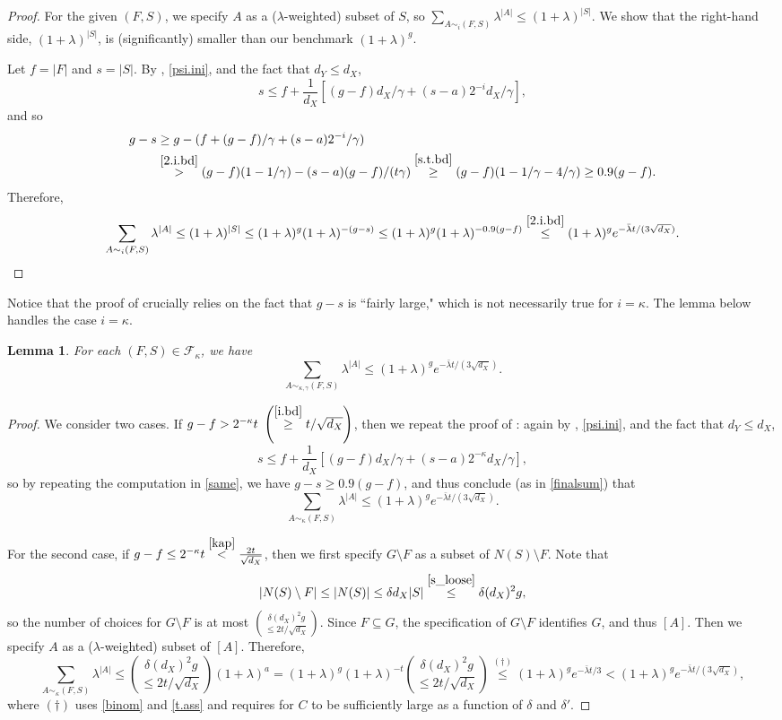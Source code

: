 \documentclass[a4paper]{amsart}
\newtheorem{lem}[thm]{Lemma}
\theoremstyle{definition}
\newcommand{\gl}{\lambda}
\newcommand{\beq}[1]{\begin{equation}\label{#1}}
\newcommand{\enq}[0]{\end{equation}}
\newcommand{\sub}[0]{\subseteq}
\newcommand{\0}[0]{\emptyset}
\newcommand{\qr}{\gamma}
\begin{document}
\begin{proof}
For the given $(F,S)$, we specify $A$ as a ($\gl$-weighted) subset of $S$, so $\sum_{A \sim_i(F,S)} \gl^{|A|} \le (1+\gl)^{|S|}$. We show that the right-hand side, $(1+\gl)^{|S|}$, is (significantly) smaller than our benchmark $(1+\gl)^g$.

Let $f=|F|$ and $s=|S|.$ By , \eqref{psi.ini}, and the fact that $d_Y\leq d_X$,
\[s \le f+\frac{1}{d_X}[(g-f)d_X/\qr+(s-a)2^{-i}d_X/\qr],\]
and so
\beq{same}\begin{split} g-s &\ge g-(f+(g-f)/\qr+(s-a)2^{-i}/\qr)\\
& \stackrel{\eqref{2.i.bd}}{>} (g-f)(1-1/\qr)-(s-a)(g-f)/(t\qr)\stackrel{\eqref{s.t.bd}}{\ge}(g-f)(1-1/\qr-4/\qr)\ge 0.9(g-f).\end{split}\enq
Therefore,
\beq{finalsum}\sum_{A \sim_i (F, S)} \gl^{|A|} \le (1+\gl)^{|S|} \le (1+\gl)^g(1+\gl)^{-(g-s)} \le (1+\gl)^g(1+\gl)^{-0.9(g-f)}\stackrel{\eqref{2.i.bd}}{\le }(1+\gl)^ge^{-\bar\gl t/(3\sqrt {d_X})}.\enq
\end{proof}

Notice that the proof of  crucially relies on the fact that $g-s$ is ``fairly large," which is not necessarily true for $i=\kappa$. The lemma below handles the case $i=\kappa$.

\begin{lem}\label{lem_large F} For each $(F, S) \in \mathcal{F}_\kappa$, we have
\[\sum_{A \sim_{\kappa, \gamma} (F, S)} \gl^{|A|} \le (1+\gl)^ge^{-\bar\gl t/(3\sqrt{d_X})}.\]
\end{lem}

\begin{proof} We consider two cases. If $g-f>2^{-\kappa}t~\left(\stackrel{\eqref{i.bd}}{\ge} t/\sqrt {d_X} \right)$, then we repeat the proof of : again by , \eqref{psi.ini}, and the fact that $d_Y\leq d_X$,
\[s \le f+\frac{1}{d_X}[(g-f)d_X/\qr+(s-a)2^{-\kappa}d_X/\qr],\]
so by repeating the computation in \eqref{same}, we have $g-s \ge 0.9(g-f)$, and thus conclude (as in \eqref{finalsum}) that
\[\sum_{A \sim_\kappa(F,S)} \gl^{|A|} \le (1+\gl)^ge^{-\bar\gl t/(3\sqrt{d_X})}.\]

For the second case, if $g-f \le 2^{-\kappa} t \stackrel{\eqref{kap}}{<}\frac{2t}{\sqrt{d_X}}$, then we first specify $G \setminus F$ as a subset of $N(S) \setminus F$. Note that 
\[|N(S) \setminus F| \le |N(S)| \le \delta d_X|S| \stackrel{\eqref{s_loose}}{\le} \delta(d_X)^2g,\]
so the number of choices for $G \setminus F$ is at most $\displaystyle {\delta (d_X)^2g \choose \le 2t/\sqrt {d_X}}.$  Since $F \sub G$, the specification of $G \setminus F$ identifies $G$, and thus $[A]$. Then we specify $A$ as a ($\lambda$-weighted) subset of $[A]$. Therefore,
\[\sum_{A \sim_\kappa (F, S)} \gl^{|A|} \le {\delta(d_X)^2 g \choose \le 2t/\sqrt {d_X}} (1+\gl)^a =(1+\gl)^g(1+\gl)^{-t}{\delta(d_X)^2 g \choose \le 2t/\sqrt {d_X}}\stackrel{(\dagger)}{\leq}(1+\gl)^ge^{-\bar\gl t/3}<(1+\gl)^g e^{-\bar\gl t/(3\sqrt{d_X})},\]
where $(\dagger)$ uses \eqref{binom} and \eqref{t.ass} and requires for $C$ to be sufficiently large as a function of $\delta$ and $\delta'$.
\end{proof}
\end{document}
